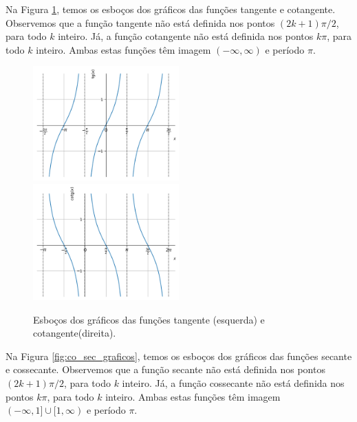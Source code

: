 \documentclass[../main.tex]{subfiles}
\begin{document}
Na Figura \ref{fig:co_tg_graficos}, temos os esboços dos gráficos das funções tangente e cotangente. Observemos que a função tangente não está definida nos pontos $(2k+1)\pi/2$, para todo $k$ inteiro. Já, a função cotangente não está definida nos pontos $k\pi$, para todo $k$ inteiro. Ambas estas funções têm imagem $(-\infty, \infty)$ e período $\pi$.

\begin{figure}[H]
  \centering
  \includegraphics[width=0.5\textwidth]{fig_func/fig_tg_grafico}~
  \includegraphics[width=0.5\textwidth]{fig_func/fig_cotg_grafico}
  \caption{Esboços dos gráficos das funções tangente (esquerda) e cotangente(direita).}
  \label{fig:co_tg_graficos}
\end{figure}

Na Figura \ref{fig:co_sec_graficos}, temos os esboços dos gráficos das funções secante e cossecante. Observemos que a função secante não está definida nos pontos $(2k+1)\pi/2$, para todo $k$ inteiro. Já, a função cossecante não está definida nos pontos $k\pi$, para todo $k$ inteiro. Ambas estas funções têm imagem $(-\infty, 1]\cup [1, \infty)$ e período $\pi$.
\end{document}
